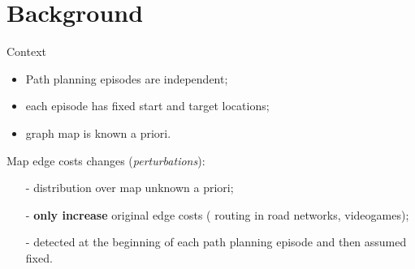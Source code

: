 \section*{Background}

\begin{frame}{Context}
    \begin{itemize}
        \item Path planning episodes are independent;
        \item each episode has fixed start and target locations;
        \item graph map is known a priori.
    \end{itemize}
    
    \medskip
    Map edge costs changes (\textit{perturbations}):
    \begin{itemize}
        \item[-] distribution over map unknown a priori;
        \item[-] \textbf{only increase} original edge costs (\eg{} routing in road networks, videogames);
        \item[-] detected at the beginning of each path planning episode and then assumed fixed.
    \end{itemize}
\end{frame}

